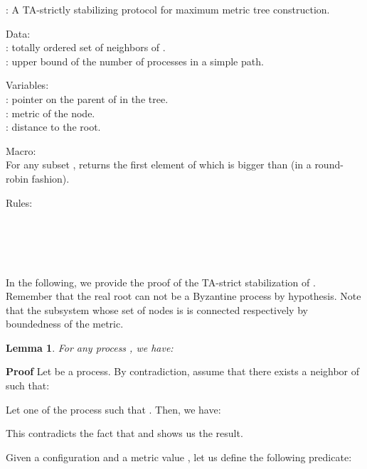 \documentclass[11pt]{article}
\newenvironment{proof}{\noindent\textbf{Proof}}{\hfill\qed}
\newcommand{\qed}{\hfill}
\newtheorem{lem}{Lemma}
\newenvironment{lemma}[1]{\vspace{-0.25cm}\begin{lem}#1}{\end{lem}\vspace{-0.3cm}}
\begin{document}
\begin{algorithm}
\caption{: A TA-strictly stabilizing protocol for maximum metric tree construction.}\label{algo:max}
\scriptsize
\begin{description}
\item{Data:}~\\
: totally ordered set of neighbors of .\\
: upper bound of the number of processes in a simple path.
\item{Variables:}~\\
: pointer on the parent of  in the tree.\\
: metric of the node.\\
: distance to the root.
\item{Macro:}~\\
For any subset ,  returns the first element of  which is bigger than  (in a round-robin fashion).
\item{Rules:}~\\


\\ 

\\

\\
\\

\end{description}
\end{algorithm}
\normalsize

In the following, we provide the proof of the TA-strict stabilization of . Remember that the real root  can not be a Byzantine process by hypothesis. Note that the subsystem whose set of nodes is  is connected respectively by boundedness of the metric.

\begin{lemma}\label{lem:goodProperty}
For any process , we have:

\end{lemma}

\begin{proof}
Let  be a process. By contradiction, assume that there exists a neighbor  of  such that:

Let  one of the process such that . Then, we have:

This contradicts the fact that  and shows us the result.
\end{proof}

Given a configuration  and a metric value , let us define the following predicate: 
\end{document}
